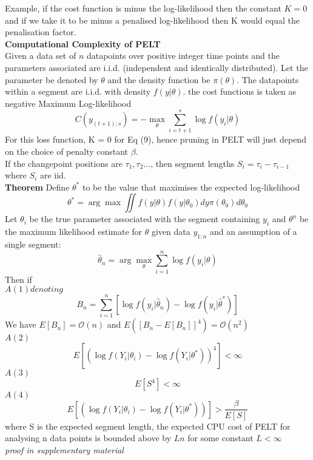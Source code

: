\documentclass{article}
\begin{document}
Example, if the cost function is minus the log-likelihood then the constant $K = 0$ and if we take it to be minus a penalised log-likelihood then K would equal the penalisation factor.\\ %
\textbf{Computational Complexity of PELT}\\
Given a data set of $n$ datapoints over positive integer time points and the parameters associated are i.i.d. (independent and identically distributed). Let the parameter be denoted by $\theta$ and the density function be $\pi(\theta)$. The datapoints within a segment are i.i.d. with density $f(y|\theta)$. the cost functions is taken as negative Maximum Log-likelihood
\begin{equation*}
    C(y_{(t+1):s}) = -\max_{\theta} \sum_{i=t+1}^{s} \log f(y_{i}|\theta)
\end{equation*}
For this loss function, K = 0 for Eq (9), hence pruning in PELT will just depend on the choice of penalty constant $\beta$.\\
If the changepoint positions are $\tau_{1},\tau_{2}...$, then segment lengths $S_{i} = \tau_{i} - \tau_{i-1}$ where $S_{i}$ are iid.\\
\textbf{Theorem} Define $\theta^{*}$ to be the value that maximises the expected log-likelihood
$$\theta^{*} = \arg\max\iint f(y|\theta) f(y|\theta_{0})dy\pi(\theta_{0})d\theta_{0}$$
Let $\theta_{i}$ be the true parameter associated with the segment containing $y_{i}$ and $\theta^{n}$ be the maximum likelihood estimate for $\theta$ given data $y_{1:n}$ and an assumption of a single segment:
$$\hat{\theta}_{n} = \arg \max_{\theta} \sum_{i=1}^{n}\log f(y_{i}|\theta)$$
Then if\\
$A(1) denoting$
$$B_{n} = \sum_{i=1}^{n}\left[\log f(y_{i}|\hat{\theta}_{n}) - \log f(y_{i}|\hat{\theta}^{*}) \right]$$
We have $E[B_{n}] = \mathcal{O}(n)$ and $E([B_{n} - E[B_{n}]]^{4}) = \mathcal{O}(n^{2})$\\
$A(2)$\\
$$E[(\log f(Y_{i}|\theta_{i}) - \log f(Y_{i}|\theta^{*}))^{4}] <  \infty$$
$A(3)$\\
$$E[S^{4}] < \infty$$
$A(4)$\\
$$E[(\log f(Y_{i}|\theta_{i}) - \log f(Y_{i}|\theta^{*}))] >\frac{\beta}{E[S]}$$
where S is the expected segment length, the expected CPU cost of PELT for analysing n data points is bounded above by $Ln$ for some constant $L < \infty$\\
\textit{proof in supplementary material}\\
\end{document}
